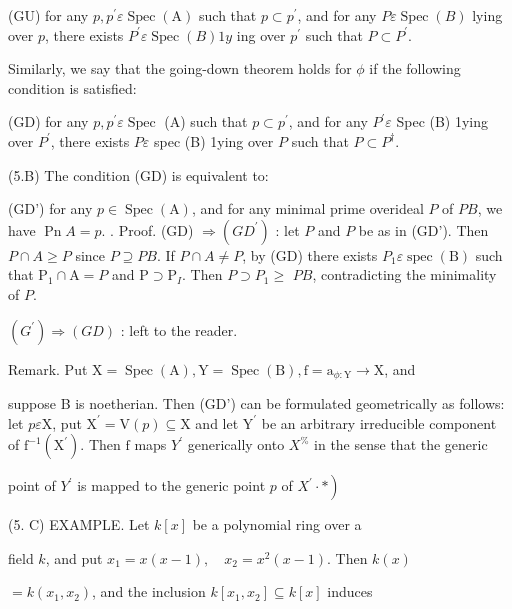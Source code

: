 (GU) for any $p, p^{\prime} \varepsilon \operatorname{Spec}(\mathrm{A})$ such that $p \subset p^{\prime}$, and for any $P \varepsilon \operatorname{Spec}(B)$ lying over $p$, there exists $P^{\prime} \varepsilon \operatorname{Spec}(B) 1 y$ ing over $p^{\prime}$ such that $P \subset P^{\prime}$.

Similarly, we say that the going-down theorem holds for $\phi$ if the following condition is satisfied:

(GD) for any $p, p^{\prime} \varepsilon \operatorname{Spec}$ (A) such that $p \subset p^{\prime}$, and for any $P^{\prime} \varepsilon$ Spec (B) 1ying over $P^{\prime}$, there exists $P \varepsilon$ spec (B) 1ying over $P$ such that $P \subset P^{\dagger}$.

(5.B) The condition (GD) is equivalent to:

(GD') for any $p \in \operatorname{Spec}(\mathrm{A})$, and for any minimal prime overideal $P$ of $P B$, we have $\operatorname{Pn} A=p$. . Proof. (GD) $\Rightarrow\left(G D^{\prime}\right)$ : let $P$ and $P$ be as in (GD'). Then $P \cap A \geqslant P$ since $P \supseteq P B$. If $P \cap A \neq P$, by (GD) there exists $P_{1} \varepsilon \operatorname{spec}(\mathrm{B})$ such that $\mathrm{P}_{1} \cap \mathrm{A}=P$ and $\mathrm{P} \supset \mathrm{P}_{I}$. Then $P \supset P_{1} \geq$ $P B$, contradicting the minimality of $P$.

$\left(G^{\prime}\right) \Rightarrow(G D)$ : left to the reader.

Remark. Put $\mathrm{X}=\operatorname{Spec}(\mathrm{A}), \mathrm{Y}=\operatorname{Spec}(\mathrm{B}), \mathrm{f}=\mathrm{a}_{\phi: \mathrm{Y}} \rightarrow \mathrm{X}$, and

suppose B is noetherian. Then (GD') can be formulated geometrically as follows: let $p \varepsilon \mathrm{X}$, put $\mathrm{X}^{\prime}=\mathrm{V}(p) \subseteq \mathrm{X}$ and let $\mathrm{Y}^{\prime}$ be an arbitrary irreducible component of $\mathrm{f}^{-1}\left(\mathrm{X}^{\prime}\right)$. Then $\mathrm{f}$ maps $Y^{\prime}$ generically onto $X^{\%}$ in the sense that the generic

point of $Y^{\prime}$ is mapped to the generic point $p$ of $\left.X^{\prime} \cdot *\right)$

(5. C) EXAMPLE. Let $k[x]$ be a polynomial ring over a

field $k$, and put $x_{1}=x(x-1), \quad x_{2}=x^{2}(x-1)$. Then $k(x)$

$=k\left(x_{1}, x_{2}\right)$, and the inclusion $k\left[x_{1}, x_{2}\right] \subseteq k[x]$ induces

